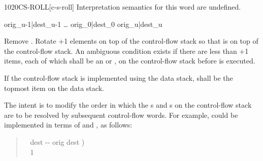 \begin{worddef}{1020}{CS-ROLL}[c-s-roll]
\interpret
	Interpretation semantics for this word are undefined.

\execute
			 {orig_{u-1}|dest_{u-1} {\ldots} orig_0|dest_0 orig_u|dest_u}

	Remove . Rotate +1 elements on top of the
	control-flow stack so that  is on top of
	the control-flow stack. An ambiguous condition exists if there
	are less than +1 items, each of which shall be an
	 or , on the control-flow stack before
	 is executed.

	If the control-flow stack is implemented using the data stack,
	 shall be the topmost item on the data stack.

	\begin{rationale} %
		The intent is to modify the order in which the s
		and s on the control-flow stack are to be resolved
		by subsequent control-flow words. For example, 
		could be implemented in terms of  and
		, as follows:

		\begin{quote}\ttfamily
			\word{:}  ~  dest -{}- orig dest ) \\
			\tab {}  ~ 1  \\
			\word{;} 
		\end{quote}
	\end{rationale}

	\begin{testing} %
	\ttfamily
		 \\


\end{testing}
\end{worddef}
